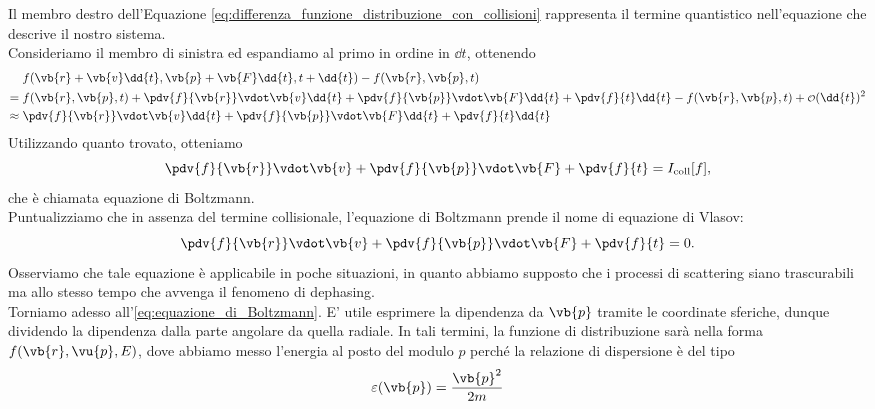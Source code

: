 Il membro destro dell'Equazione \eqref{eq:differenza_funzione_distribuzione_con_collisioni} rappresenta il termine quantistico nell'equazione che descrive il nostro sistema.\\
Consideriamo il membro di sinistra ed espandiamo al primo in ordine in $\dd{t}$, ottenendo
\begin{equation*}
    \begin{split}
        & \hspace{0.1cm} f(\vb{r} + \vb{v} \dd{t}, \vb{p} + \vb{F} \dd{t}, t + \dd{t}) - f(\vb{r}, \vb{p}, t)
        \\
        = & \hspace{0.1cm} f(\vb{r}, \vb{p}, t) + \pdv{f}{\vb{r}} \vdot \vb{v} \dd{t} + \pdv{f}{\vb{p}} \vdot \vb{F} \dd{t} + \pdv{f}{t} \dd{t} - f(\vb{r}, \vb{p}, t) + \smallO{(\dd{t})^2}
        \\
        \approx & \hspace{0.1cm} \pdv{f}{\vb{r}} \vdot \vb{v} \dd{t} + \pdv{f}{\vb{p}} \vdot \vb{F} \dd{t} + \pdv{f}{t} \dd{t}
    \end{split}
\end{equation*}
Utilizzando quanto trovato, otteniamo
\begin{equation}
    \pdv{f}{\vb{r}} \vdot \vb{v} + \pdv{f}{\vb{p}} \vdot \vb{F} + \pdv{f}{t}
    =I_{\rm coll}[f],
    \label{eq:equazione_di_Boltzmann}
\end{equation}
che è chiamata equazione di Boltzmann.\\
Puntualizziamo che in assenza del termine collisionale, l'equazione di Boltzmann prende il nome di equazione di Vlasov:
\begin{equation}
    \pdv{f}{\vb{r}} \vdot \vb{v} + \pdv{f}{\vb{p}} \vdot \vb{F} + \pdv{f}{t}
    =0.
    \label{eq:equazione_di_Vlasov}
\end{equation}
Osserviamo che tale equazione è applicabile in poche situazioni, in quanto abbiamo supposto che i processi di scattering siano trascurabili ma allo stesso tempo che avvenga il fenomeno di dephasing.\\
Torniamo adesso all'\eqref{eq:equazione_di_Boltzmann}. E' utile esprimere la dipendenza da $\vb{p}$ tramite le coordinate sferiche, dunque dividendo la dipendenza dalla parte angolare da quella radiale. In tali termini, la funzione di distribuzione sarà nella forma $f(\vb{r},\vu{p},E)$, dove abbiamo messo l'energia al posto del modulo $p$ perché la relazione di dispersione è del tipo
\begin{equation*}
    \varepsilon(\vb{p})=
    \frac{\vb{p}^2}{2m}
\end{equation*}
